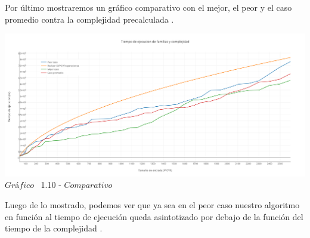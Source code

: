 Por \'ultimo mostraremos un gr\'afico comparativo con el mejor, el peor y el caso promedio contra la complejidad precalculada .\\

  
  \vspace*{0.3cm} \vspace*{0.3cm}
  \begin{center}
\includegraphics[scale=0.65]{./EJ1/comparativo1.png}
{$Gr$\'a$fico$ \ 1.10 - $Comparativo$}
  \end{center}
  \vspace*{0.3cm}


Luego de lo mostrado, podemos ver que ya sea en el peor caso nuestro algoritmo en funci\'on al tiempo de ejecuci\'on queda asintotizado por debajo de la funci\'on del tiempo de la complejidad .